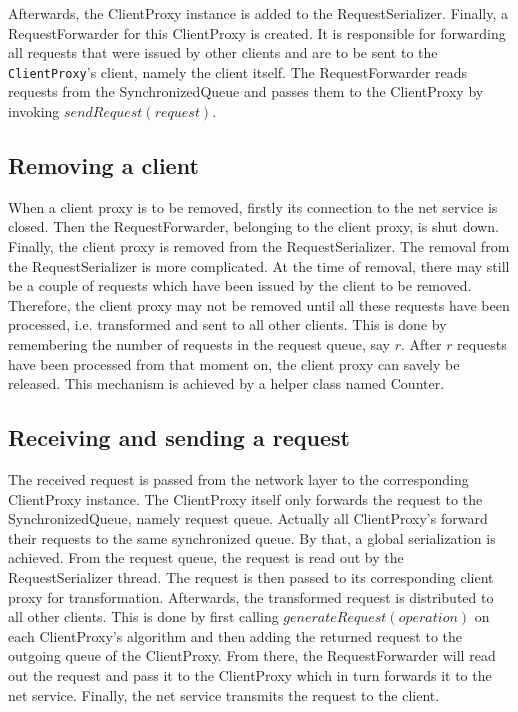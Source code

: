 Afterwards, the ClientProxy instance is added to the RequestSerializer. Finally, a RequestForwarder for this ClientProxy is created. It is responsible for forwarding all requests that were issued by other clients and are to be sent to the \texttt{ClientProxy}'s client, namely the client itself. The RequestForwarder reads requests from the SynchronizedQueue and passes them to the ClientProxy by invoking $sendRequest(request)$.

\subsection{Removing a client}
When a client proxy is to be removed, firstly its connection to the net service is closed. Then the RequestForwarder, belonging to the client proxy, is shut down. Finally, the client proxy is removed from the RequestSerializer. The removal from the RequestSerializer is more complicated. At the time of removal, there may still be a couple of requests which have been issued by the client to be removed. Therefore, the client proxy may not be removed until all these requests have been processed, i.e. transformed and sent to all other clients. This is done by remembering the number of requests in the request queue, say $r$. After $r$ requests have been processed from that moment on, the client proxy can savely be released. This mechanism is achieved by a helper class named Counter.

\subsection{Receiving and sending a request}
The received request is passed from the network layer to the corresponding ClientProxy instance. The ClientProxy itself only forwards the request to the SynchronizedQueue, namely request queue. Actually all ClientProxy's forward their requests to the same synchronized queue. By that, a global serialization is achieved. From the request queue, the request is read out by the RequestSerializer thread. The request is then passed to its corresponding client proxy for transformation. Afterwards, the transformed request is distributed to all other clients. This is done by first calling $generateRequest(operation)$ on each ClientProxy's algorithm and then adding the returned request to the outgoing queue of the ClientProxy. From there, the RequestForwarder will read out the request and pass it to the ClientProxy which in turn forwards it to the net service. Finally, the net service transmits the request to the client.

